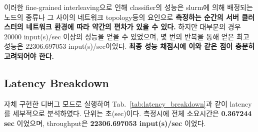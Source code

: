 이러한 fine-grained interleaving으로 인해 classifier의 성능은
slurm에 의해 배정되는 노드의 종류나 그 사이의 네트워크 topology등의 요인으로
\textbf{측정하는 순간의 서버 클러스터의 네트워크 환경에 따라 약간의 편차가 있을 수 있다.}
하지만 대부분의 경우 20000 input(s)/sec 이상의 성능을 얻을 수 있었으며,
몇 번의 반복을 통해 얻은 최고 성능은 22306.697053 input(s)/sec이었다.
\textbf{최종 성능 채점시에 이와 같은 점이 충분히 고려되어야 한다.}

\subsection{Latency Breakdown}

자체 구현한 디버그 모드로 실행하여 Tab.~\ref{tab:latency_breakdown}과 같이 
latency를 세부적으로 분석하였다. 단위는 초(sec)이다.
측정시에 전체 소요시간은 \textbf{0.367244 sec} 이었으며, throughput은 \textbf{22306.697053 input(s)/sec} 이었다.

